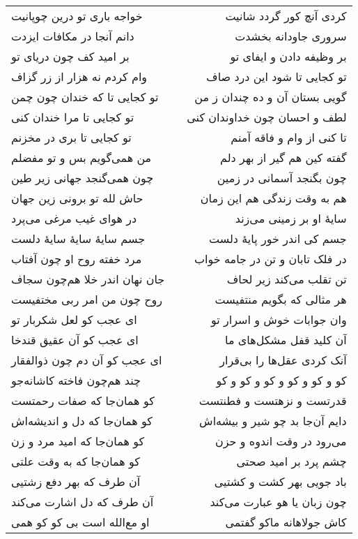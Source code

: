 \begin{center}
\begin{longtable}{l p{0.5cm} r}
\\
خواجه باری تو درین چوپانیت
&&
کردی آنچ کور گردد شانیت
\\
دانم آنجا در مکافات ایزدت
&&
سروری جاودانه بخشدت
\\
بر امید کف چون دریای تو
&&
بر وظیفه دادن و ایفای تو
\\
وام کردم نه هزار از زر گزاف
&&
تو کجایی تا شود این درد صاف
\\
تو کجایی تا که خندان چون چمن
&&
گویی بستان آن و ده چندان ز من
\\
تو کجایی تا مرا خندان کنی
&&
لطف و احسان چون خداوندان کنی
\\
تو کجایی تا بری در مخزنم
&&
تا کنی از وام و فاقه آمنم
\\
من همی‌گویم بس و تو مفضلم
&&
گفته کین هم گیر از بهر دلم
\\
چون همی‌گنجد جهانی زیر طین
&&
چون بگنجد آسمانی در زمین
\\
حاش لله تو برونی زین جهان
&&
هم به وقت زندگی هم این زمان
\\
در هوای غیب مرغی می‌پرد
&&
سایهٔ او بر زمینی می‌زند
\\
جسم سایهٔ سایهٔ سایهٔ دلست
&&
جسم کی اندر خور پایهٔ دلست
\\
مرد خفته روح او چون آفتاب
&&
در فلک تابان و تن در جامه خواب
\\
جان نهان اندر خلا هم‌چون سجاف
&&
تن تقلب می‌کند زیر لحاف
\\
روح چون من امر ربی مختفیست
&&
هر مثالی که بگویم منتفیست
\\
ای عجب کو لعل شکربار تو
&&
وان جوابات خوش و اسرار تو
\\
ای عجب کو آن عقیق قندخا
&&
آن کلید قفل مشکل‌های ما
\\
ای عجب کو آن دم چون ذوالفقار
&&
آنک کردی عقل‌ها را بی‌قرار
\\
چند هم‌چون فاخته کاشانه‌جو
&&
کو و کو و کو و کو و کو و کو
\\
کو همان‌جا که صفات رحمتست
&&
قدرتست و نزهتست و فطنتست
\\
کو همان‌جا که دل و اندیشه‌اش
&&
دایم آن‌جا بد چو شیر و بیشه‌اش
\\
کو همان‌جا که امید مرد و زن
&&
می‌رود در وقت اندوه و حزن
\\
کو همان‌جا که به وقت علتی
&&
چشم پرد بر امید صحتی
\\
آن طرف که بهر دفع زشتیی
&&
باد جویی بهر کشت و کشتیی
\\
آن طرف که دل اشارت می‌کند
&&
چون زبان یا هو عبارت می‌کند
\\
او مع‌الله است بی کو کو همی
&&
کاش جولاهانه ماکو گفتمی
\\

\end{longtable}
\end{center}
